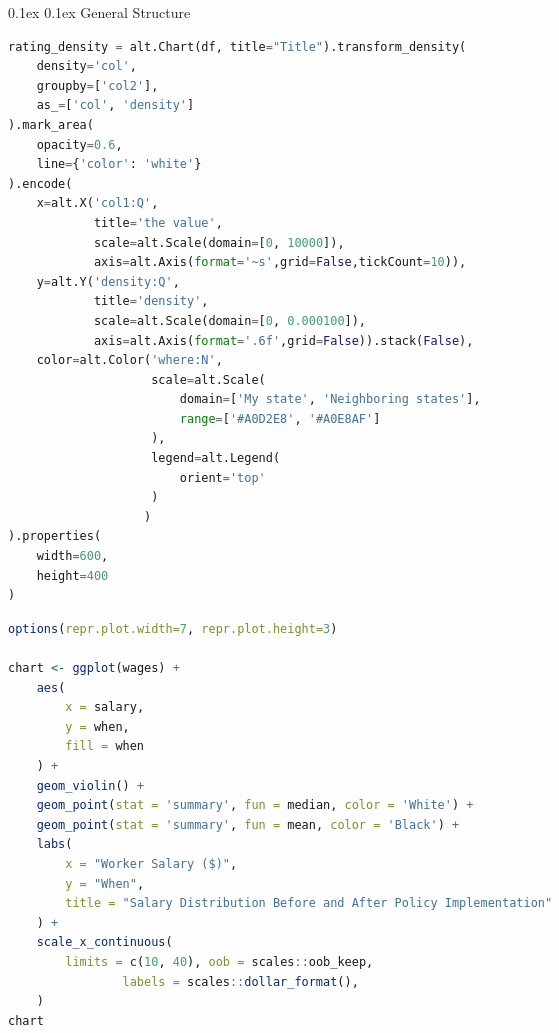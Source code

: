 \documentclass[8pt,landscape]{article}
\makeatletter
\renewcommand{\subsection}{\@startsection{subsection}{2}{0pt}%
    {0.1ex}%
    {0.1ex}%
    {\fontsize{8}{9}\bfseries\color{blue}}} %
\makeatother
\begin{document}
\fontsize{8}{9}\selectfont %
\pagestyle{empty}
\begin{multicols}{3}

\subsection{General Structure}
\begin{lstlisting}[language=Python]
  rating_density = alt.Chart(df, title="Title").transform_density(
    density='col',
    groupby=['col2'],
    as_=['col', 'density']
).mark_area(
    opacity=0.6,
    line={'color': 'white'}
).encode(
    x=alt.X('col1:Q',
            title='the value',
            scale=alt.Scale(domain=[0, 10000]),
            axis=alt.Axis(format='~s',grid=False,tickCount=10)),
    y=alt.Y('density:Q',
            title='density',
            scale=alt.Scale(domain=[0, 0.000100]),
            axis=alt.Axis(format='.6f',grid=False)).stack(False),
    color=alt.Color('where:N',
                    scale=alt.Scale(
                        domain=['My state', 'Neighboring states'],
                        range=['#A0D2E8', '#A0E8AF']
                    ),
                    legend=alt.Legend(
                        orient='top' 
                    )
                   )
).properties(
    width=600,
    height=400
)
\end{lstlisting}
\begin{lstlisting}[language=R]
  options(repr.plot.width=7, repr.plot.height=3)

chart <- ggplot(wages) +
    aes(
        x = salary,
        y = when,
        fill = when
    ) +
    geom_violin() +
    geom_point(stat = 'summary', fun = median, color = 'White') +
    geom_point(stat = 'summary', fun = mean, color = 'Black') +
    labs(
        x = "Worker Salary ($)",
        y = "When",
        title = "Salary Distribution Before and After Policy Implementation" 
    ) +
    scale_x_continuous(
        limits = c(10, 40), oob = scales::oob_keep,
                labels = scales::dollar_format(), 
    ) 
chart
\end{lstlisting}


\end{multicols}
\end{document}
